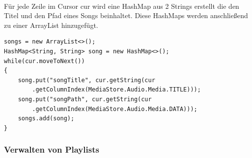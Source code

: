 \documentclass[FIPLY_base.tex]{subfiles}
\begin{document}
\newpage
\ \\
Für jede Zeile im Cursor cur wird eine HashMap aus 2 Strings erstellt die den Titel und den Pfad eines Songs beinhaltet. Diese HashMaps werden anschließend zu einer ArrayList hinzugefügt.
\begin{lstlisting}[caption={Speichern der Songverweise in eine ArrayList von HashMaps},label=DescriptiveLabel]
songs = new ArrayList<>();
HashMap<String, String> song = new HashMap<>();
while(cur.moveToNext())
{
	song.put("songTitle", cur.getString(cur
		.getColumnIndex(MediaStore.Audio.Media.TITLE)));
	song.put("songPath", cur.getString(cur
		.getColumnIndex(MediaStore.Audio.Media.DATA)));
	songs.add(song);
}
\end{lstlisting}


\subsubsection {Verwalten von Playlists}
\end{document}

